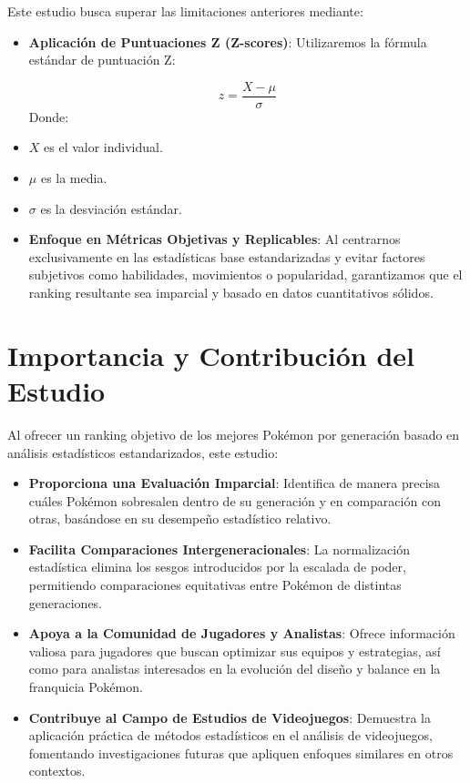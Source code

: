 \documentclass[
]{article}
\providecommand{\tightlist}{%
  \setlength{\itemsep}{0pt}\setlength{\parskip}{0pt}}
\begin{document}
Este estudio busca superar las limitaciones anteriores mediante:

\begin{itemize}
\item
  \textbf{Aplicación de Puntuaciones Z (Z-scores)}: Utilizaremos la
  fórmula estándar de puntuación Z:

  \[z = \frac{X - \mu}{\sigma}\] Donde:
\item
  \(X\) es el valor individual.
\item
  \(\mu\) es la media.
\item
  \(\sigma\) es la desviación estándar.
\item
  \textbf{Enfoque en Métricas Objetivas y Replicables}: Al centrarnos
  exclusivamente en las estadísticas base estandarizadas y evitar
  factores subjetivos como habilidades, movimientos o popularidad,
  garantizamos que el ranking resultante sea imparcial y basado en datos
  cuantitativos sólidos.
\end{itemize}

\section{Importancia y Contribución del
Estudio}\label{importancia-y-contribuciuxf3n-del-estudio}

Al ofrecer un ranking objetivo de los mejores Pokémon por generación
basado en análisis estadísticos estandarizados, este estudio:

\begin{itemize}
\tightlist
\item
  \textbf{Proporciona una Evaluación Imparcial}: Identifica de manera
  precisa cuáles Pokémon sobresalen dentro de su generación y en
  comparación con otras, basándose en su desempeño estadístico relativo.
\item
  \textbf{Facilita Comparaciones Intergeneracionales}: La normalización
  estadística elimina los sesgos introducidos por la escalada de poder,
  permitiendo comparaciones equitativas entre Pokémon de distintas
  generaciones.
\item
  \textbf{Apoya a la Comunidad de Jugadores y Analistas}: Ofrece
  información valiosa para jugadores que buscan optimizar sus equipos y
  estrategias, así como para analistas interesados en la evolución del
  diseño y balance en la franquicia Pokémon.
\item
  \textbf{Contribuye al Campo de Estudios de Videojuegos}: Demuestra la
  aplicación práctica de métodos estadísticos en el análisis de
  videojuegos, fomentando investigaciones futuras que apliquen enfoques
  similares en otros contextos.
\end{itemize}
\end{document}
